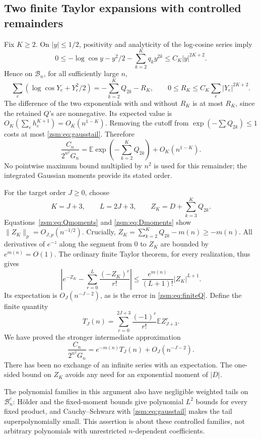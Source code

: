 \documentclass[11pt]{article}
\theoremstyle{definition}\newtheorem{definition}[theorem]{Definition}
\theoremstyle{remark}\newtheorem{remark}[theorem]{Remark}
\newcommand{\E}{\mathbb E}
\begin{document}
\subsection{Two finite Taylor expansions with controlled remainders}
Fix $K\ge2$. On $|y|\le1/2$, positivity and analyticity of the log-cosine
series imply
\[
 0\le-\log\cos y-y^2/2-\sum_{k=2}^Kq_ky^{2k}
 \le C_K|y|^{2K+2}.
\]
Hence on $\mathcal B_n$, for all sufficiently large $n$,
\[
 \sum_e(\log\cos Y_e+Y_e^2/2)=-\sum_{k=2}^KQ_{2k}-R_K,
 \qquad0\le R_K\le C_K\sum_e|Y_e|^{2K+2}.
\]
The difference of the two exponentials with and without $R_K$ is at most
$R_K$, since the retained $Q$'s are nonnegative. Its expected value is
$O_K(\sum_e h_e^{K+1})=O_K(n^{1-K})$. Removing the cutoff from
$\exp(-\sum Q_{2k})\le1$ costs at most \eqref{zsm:eq:gausstail}. Therefore
\begin{equation}\label{zsm:eq:finiteQ}
 \frac{C_n}{2^{n^2}G_n}=\E\exp\left(-\sum_{k=2}^KQ_{2k}\right)
 +O_K(n^{1-K}).
\end{equation}
No pointwise maximum bound multiplied by $n^2$ is used for this remainder;
the integrated Gaussian moments provide its stated order.

For the target order $J\ge0$, choose
\begin{equation}\label{zsm:eq:KLZ}
 K=J+3,\qquad L=2J+3,\qquad Z_K=D+\sum_{k=3}^KQ_{2k}.
\end{equation}
Equations~\eqref{zsm:eq:Qmoments} and \eqref{zsm:eq:Dmoments} show
$\|Z_K\|_p=O_{J,p}(n^{-1/2})$. Crucially,
$Z_K=\sum_{k=2}^KQ_{2k}-m(n)\ge-m(n)$. All derivatives of $e^{-z}$ along the
segment from $0$ to $Z_K$ are bounded by $e^{m(n)}=O(1)$. The ordinary finite
Taylor theorem, for every realization, thus gives
\[
 \left|e^{-Z_K}-\sum_{r=0}^L\frac{(-Z_K)^r}{r!}\right|
 \le\frac{e^{m(n)}}{(L+1)!}|Z_K|^{L+1}.
\]
Its expectation is $O_J(n^{-J-2})$, as is the error in \eqref{zsm:eq:finiteQ}.
Define the finite quantity
\begin{equation}\label{zsm:eq:TJ}
 T_J(n)=\sum_{r=0}^{2J+3}\frac{(-1)^r}{r!}\E Z_{J+3}^r.
\end{equation}
We have proved the stronger intermediate approximation
\begin{equation}\label{zsm:eq:finiteapproximant}
 \frac{C_n}{2^{n^2}G_n}=e^{-m(n)}T_J(n)+O_J(n^{-J-2}).
\end{equation}
There has been no exchange of an infinite series with an expectation. The
one-sided bound on $Z_K$ avoids any need for an exponential moment of $|D|$.

The polynomial families in this argument also have negligible weighted tails
on $\mathcal B_n^c$: H\"older and the fixed-moment bounds give polynomial
$L^2$ bounds for every fixed product, and Cauchy--Schwarz with
\eqref{zsm:eq:gausstail} makes the tail superpolynomially small. This assertion is
about these controlled families, not arbitrary polynomials with unrestricted
$n$-dependent coefficients.
\end{document}
